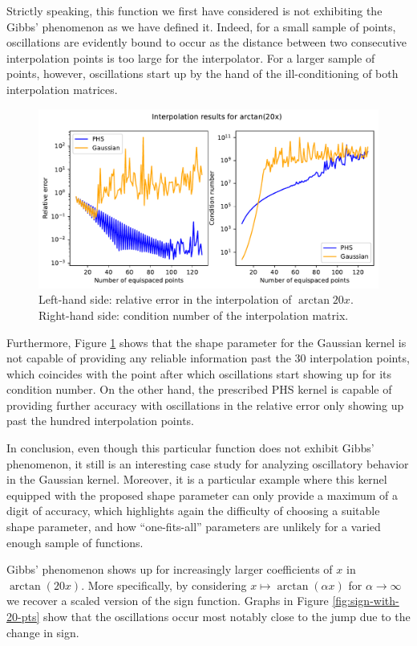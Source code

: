 \documentclass[12pt]{report} %
\begin{document}
Strictly speaking, this function we first have considered is not exhibiting the Gibbs' phenomenon as we have defined it. Indeed, for a small sample of points, oscillations are evidently bound to occur as the distance between two consecutive interpolation points is too large for the interpolator. For a larger sample of points, however, oscillations start up by the hand of the ill-conditioning of both interpolation matrices.

\begin{figure}[ht]
  \centering
  \includegraphics[width=.8\textwidth]{imagenes/experiments/1d/intro/arctan20x-interpolation-curves.pdf}
  \caption{Left-hand side: relative error in the interpolation of $\arctan{20x}$. Right-hand side: condition number of the interpolation matrix.}
  \label{fig:arctan-with-curves}
\end{figure}

Furthermore, Figure \ref{fig:arctan-with-curves} shows that the shape parameter for the Gaussian kernel is not capable of providing any reliable information past the 30 interpolation points, which coincides with the point after which oscillations start showing up for its condition number. On the other hand, the prescribed PHS kernel is capable of providing further accuracy with oscillations in the relative error only showing up past the hundred interpolation points.

In conclusion, even though this particular function does not exhibit Gibbs' phenomenon, it still is an interesting case study for analyzing oscillatory behavior in the Gaussian kernel. Moreover, it is a particular example where this kernel equipped with the proposed shape parameter can only provide a maximum of a digit of accuracy, which highlights again the difficulty of choosing a suitable shape parameter, and how ``one-fits-all'' parameters are unlikely for a varied enough sample of functions.

Gibbs' phenomenon shows up for increasingly larger coefficients of $x$ in $\arctan(20x)$. More specifically, by considering $x\mapsto \arctan(\alpha x)$ for $\alpha \to \infty$ we recover a scaled version of the sign function. Graphs in Figure \ref{fig:sign-with-20-pts} show that the oscillations occur most notably close to the jump due to the change in sign.
\end{document}
